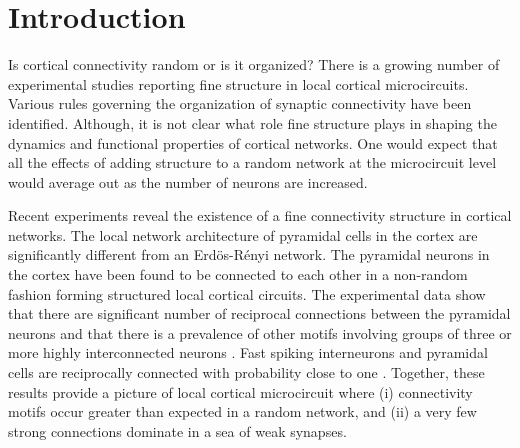 \section{Introduction}
Is cortical connectivity random or is it organized? There is a growing number of experimental studies reporting fine structure in local cortical microcircuits. Various rules governing the organization of synaptic connectivity have been identified. Although, it is not clear what role fine structure plays in shaping the dynamics and functional properties of cortical networks. One would expect that all the effects of adding structure to a random network at the microcircuit level would average out as the number of neurons are increased. 

Recent experiments reveal the existence of a fine connectivity structure in cortical networks. The local network architecture of pyramidal cells in the cortex are significantly different from an Erdös-Rényi network. The pyramidal neurons in the cortex have been found to be connected to each other in a non-random fashion forming structured local cortical circuits. The experimental data show that there are significant number of reciprocal connections between the pyramidal neurons and that there is a prevalence of other motifs involving groups of three or more highly interconnected neurons \cite{markram1997,thomson2002, Song2005, Perin2011}. Fast spiking interneurons and pyramidal cells are reciprocally connected with probability close to one \cite{Yoshimura2005}. Together, these results provide a picture of local cortical microcircuit where (i) connectivity motifs occur greater than expected in a random network, and (ii) a very few strong connections dominate in a sea of weak synapses.\\

